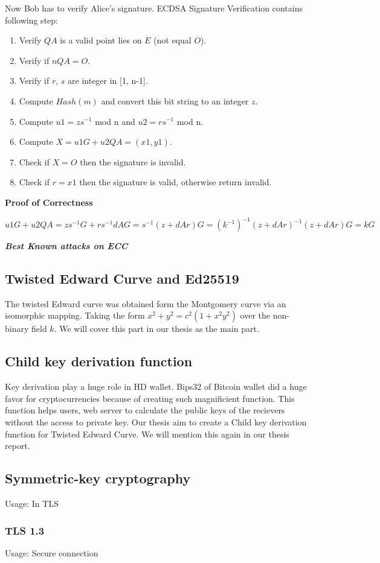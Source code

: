 Now Bob has to verify Alice's signature. ECDSA Signature Verification contains following step:
\begin{enumerate}
  \item Verify $QA$ is a valid point lies on $E$ (not equal $O$).
  \item Verify if $nQA = O$.
  \item Verify if $r$, $s$ are integer in [1, n-1].
  \item Compute $Hash(m)$ and convert this bit string to an integer $z$.
  \item Compute $u1=zs^{-1}$ mod n and $u2= rs^{-1}$ mod n.
  \item Compute $X = u1G + u2QA = (x1, y1)$.
  \item Check if $X = O$ then the signature is invalid.
  \item Check if $r = x1$ then the signature is valid, otherwise return invalid.
\end{enumerate}

{\textbf{Proof of Correctness}}

$u1G + u2QA = zs^{-1}G + rs^{-1}dAG = s^{-1}(z+dAr)G =(k^{-1})^{-1}(z+dAr)^{-1}(z+dAr)G = kG$

\bigskip
{\textit {\textbf{Best Known attacks on ECC}}}

\subsection{Twisted Edward Curve and Ed25519}
The twisted Edward curve was obtained form the Montgomery curve via an isomorphic mapping.
Taking the form $x^2 + y^2 = c^2(1+ x^2y^2)$ over the non-binary field $k$.
We will cover this part in our thesis as the main part.

\subsection{Child key derivation function}
Key derivation play a huge role in HD wallet.
Bips32 of Bitcoin wallet did a huge favor for cryptocurrencies because of creating such magnificient function.
This function helps users, web server to calculate the public keys of the recievers without the access to private key.
Our thesis aim to create a Child key derivation function for Twisted Edward Curve.
We will mention this again in our thesis report.

\subsection{Symmetric-key cryptography}
\label{sec: Symmetric_keys}
Usage: In TLS

\subsubsection{TLS 1.3}
Usage: Secure connection



